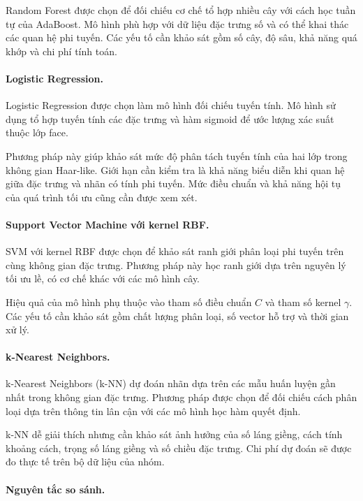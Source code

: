 \documentclass[12pt,a4paper,oneside]{report}
\begin{document}
Random Forest được chọn để đối chiếu cơ chế
tổ hợp nhiều cây với cách học tuần tự của AdaBoost.
Mô hình phù hợp với dữ liệu đặc trưng số
và có thể khai thác các quan hệ phi tuyến.
Các yếu tố cần khảo sát gồm số cây, độ sâu,
khả năng quá khớp và chi phí tính toán.

\paragraph{Logistic Regression.}

Logistic Regression được chọn làm mô hình
đối chiếu tuyến tính.
Mô hình sử dụng tổ hợp tuyến tính các đặc trưng
và hàm sigmoid để ước lượng xác suất thuộc lớp face.

Phương pháp này giúp khảo sát mức độ phân tách
tuyến tính của hai lớp trong không gian Haar-like.
Giới hạn cần kiểm tra là khả năng biểu diễn
khi quan hệ giữa đặc trưng và nhãn có tính phi tuyến.
Mức điều chuẩn và khả năng hội tụ của quá trình
tối ưu cũng cần được xem xét.

\paragraph{Support Vector Machine với kernel RBF.}

SVM với kernel RBF được chọn để khảo sát
ranh giới phân loại phi tuyến trên cùng
không gian đặc trưng.
Phương pháp này học ranh giới dựa trên nguyên lý
tối ưu lề, có cơ chế khác với các mô hình cây.

Hiệu quả của mô hình phụ thuộc vào tham số
điều chuẩn $C$ và tham số kernel $\gamma$.
Các yếu tố cần khảo sát gồm chất lượng phân loại,
số vector hỗ trợ và thời gian xử lý.

\paragraph{k-Nearest Neighbors.}

k-Nearest Neighbors (k-NN) dự đoán nhãn dựa trên
các mẫu huấn luyện gần nhất trong không gian
đặc trưng.
Phương pháp được chọn để đối chiếu cách phân loại
dựa trên thông tin lân cận với các mô hình
học hàm quyết định.

k-NN dễ giải thích nhưng cần khảo sát ảnh hưởng
của số láng giềng, cách tính khoảng cách,
trọng số láng giềng và số chiều đặc trưng.
Chi phí dự đoán sẽ được đo thực tế
trên bộ dữ liệu của nhóm.

\paragraph{Nguyên tắc so sánh.}
\end{document}
